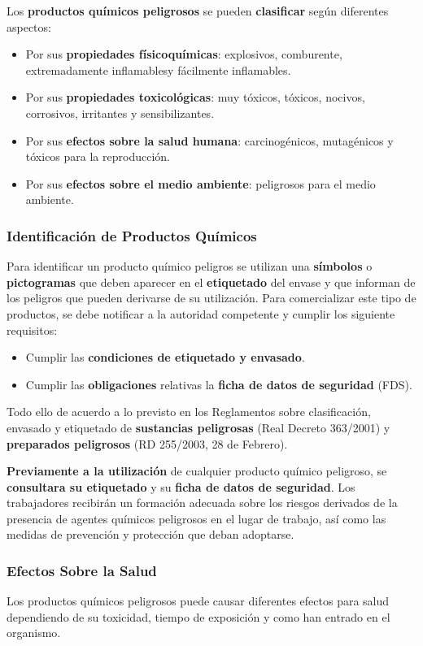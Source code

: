 Los \textbf{productos químicos peligrosos} se pueden \textbf{clasificar} según  diferentes aspectos:
\begin{itemize}
    \item Por sus \textbf{propiedades físicoquímicas}: explosivos, comburente, extremadamente inflamablesy fácilmente inflamables.
    \item Por sus \textbf{propiedades toxicológicas}: muy tóxicos, tóxicos, nocivos, corrosivos, irritantes y sensibilizantes.
    \item Por sus \textbf{efectos sobre la salud humana}: carcinogénicos, mutagénicos y tóxicos para la reproducción.
    \item Por sus \textbf{efectos sobre el medio ambiente}: peligrosos para el medio ambiente.
\end{itemize}

\subsubsection{Identificación de Productos Químicos}
Para identificar un producto químico peligros se utilizan una \textbf{símbolos} o \textbf{pictogramas} que deben aparecer en el \textbf{etiquetado} del envase y que informan de los peligros que pueden derivarse de su utilización. Para comercializar este tipo de productos, se debe notificar a la autoridad competente y cumplir los siguiente requisitos:

\begin{itemize}
    \item Cumplir las \textbf{condiciones de etiquetado y envasado}.
    \item Cumplir las \textbf{obligaciones} relativas la \textbf{ficha de datos de seguridad} (FDS).
\end{itemize}

Todo ello de acuerdo a lo previsto en los Reglamentos sobre clasificación, envasado y etiquetado de \textbf{sustancias peligrosas} (Real Decreto 363/2001) y \textbf{preparados peligrosos} (RD 255/2003, 28 de Febrero).

\textbf{Previamente a la utilización} de cualquier producto químico peligroso, se \textbf{consultara su etiquetado} y su \textbf{ficha de datos de seguridad}. Los trabajadores recibirán un formación adecuada sobre los riesgos derivados de la presencia de agentes químicos peligrosos en el lugar de trabajo, así como las medidas de prevención y protección que deban adoptarse.

\subsubsection{Efectos Sobre la Salud}
Los productos químicos peligrosos puede causar diferentes efectos para salud dependiendo de su toxicidad, tiempo de exposición y como han entrado en el organismo.

